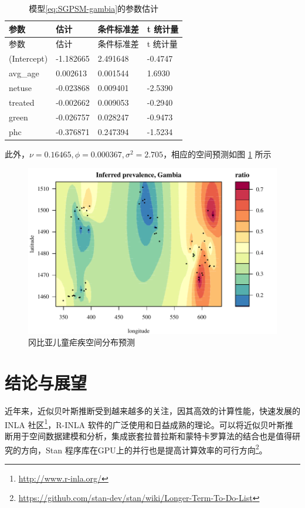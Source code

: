 \documentclass[hyperref, a4paper, UTF8, zihao = -4, linespread = 1.25, scheme = chinese]{ctexbook}
\begin{document}
\begin{longtable}[]{@{}llll@{}}
\caption{\label{tab:gambia-estimation}
模型\eqref{eq:SGPSM-gambia}的参数估计}\tabularnewline
\toprule
参数 & 估计 & 条件标准差 & t 统计量\tabularnewline
\midrule
\endfirsthead
\toprule
参数 & 估计 & 条件标准差 & t 统计量\tabularnewline
\midrule
\endhead
(Intercept) & -1.182665 & 2.491648 & -0.4747\tabularnewline
avg\_age & 0.002613 & 0.001544 & 1.6930\tabularnewline
netuse & -0.023868 & 0.009401 & -2.5390\tabularnewline
treated & -0.002662 & 0.009053 & -0.2940\tabularnewline
green & -0.026757 & 0.028247 & -0.9473\tabularnewline
phc & -0.376871 & 0.247394 & -1.5234\tabularnewline
\bottomrule
\end{longtable}

此外，\(\nu = 0.16465,\phi = 0.000367,\sigma^2 = 2.705\)，相应的空间预测如图
\ref{fig:spamm-gambia} 所示

\begin{figure}

{\centering \includegraphics[width=0.7\linewidth]{figures/spaMM-gambia} 

}

\caption{冈比亚儿童疟疾空间分布预测}\label{fig:spamm-gambia}
\end{figure}

\hypertarget{summary}{%
\chapter{结论与展望}\label{summary}}

近年来，近似贝叶斯推断受到越来越多的关注，因其高效的计算性能，快速发展的
INLA 社区\footnote{\url{http://www.r-inla.org/}}，R-INLA
软件的广泛使用和日益成熟的理论。可以将近似贝叶斯推断用于空间数据建模和分析\citep{INLA2015}，集成嵌套拉普拉斯和蒙特卡罗算法的结合也是值得研究的方向\citep{Rue2017arXiv}，Stan
程序库在GPU上的并行也是提高计算效率的可行方向\footnote{\url{https://github.com/stan-dev/stan/wiki/Longer-Term-To-Do-List}}。
\end{document}
